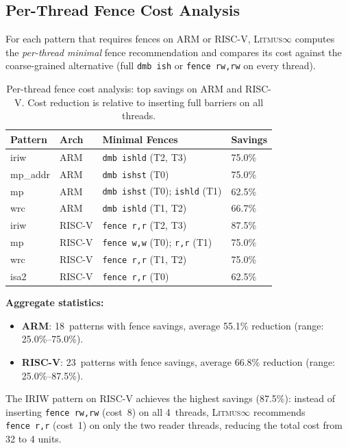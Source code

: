 \documentclass[10pt]{article}
\newcommand{\litmus}{\textsc{Litmus$\infty$}}
\begin{document}
\subsection{Per-Thread Fence Cost Analysis}
\label{sec:fence-cost}

For each pattern that requires fences on ARM or RISC-V, \litmus{}
computes the \emph{per-thread minimal} fence recommendation and
compares its cost against the coarse-grained alternative (full
\texttt{dmb~ish} or \texttt{fence~rw,rw} on every thread).

\begin{table}[h]
\centering
\caption{Per-thread fence cost analysis: top savings on ARM and RISC-V.
Cost reduction is relative to inserting full barriers on all threads.}
\label{tab:fence-cost}
\small
\begin{tabular}{llll}
\toprule
\textbf{Pattern} & \textbf{Arch} & \textbf{Minimal Fences} & \textbf{Savings} \\
\midrule
iriw     & ARM  & \texttt{dmb ishld} (T2, T3)         & 75.0\% \\
mp\_addr & ARM  & \texttt{dmb ishst} (T0)              & 75.0\% \\
mp       & ARM  & \texttt{dmb ishst} (T0); \texttt{ishld} (T1) & 62.5\% \\
wrc      & ARM  & \texttt{dmb ishld} (T1, T2)          & 66.7\% \\
\midrule
iriw     & RISC-V & \texttt{fence r,r} (T2, T3)       & 87.5\% \\
mp       & RISC-V & \texttt{fence w,w} (T0); \texttt{r,r} (T1) & 75.0\% \\
wrc      & RISC-V & \texttt{fence r,r} (T1, T2)       & 75.0\% \\
isa2     & RISC-V & \texttt{fence r,r} (T0)            & 62.5\% \\
\bottomrule
\end{tabular}
\end{table}

\textbf{Aggregate statistics:}
\begin{itemize}[nosep]
\item \textbf{ARM}: 18~patterns with fence savings, average 55.1\%
      reduction (range: 25.0\%--75.0\%).
\item \textbf{RISC-V}: 23~patterns with fence savings, average 66.8\%
      reduction (range: 25.0\%--87.5\%).
\end{itemize}

The IRIW pattern on RISC-V achieves the highest savings (87.5\%):
instead of inserting \texttt{fence~rw,rw} (cost~8) on all 4~threads,
\litmus{} recommends \texttt{fence~r,r} (cost~1) on only the two
reader threads, reducing the total cost from 32 to 4 units.
\end{document}
